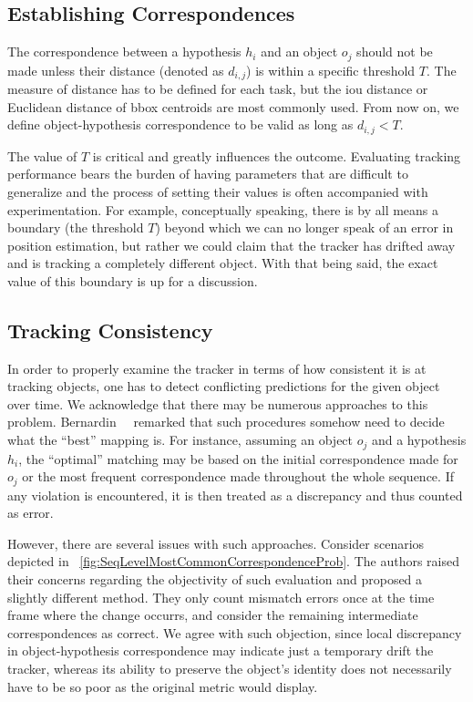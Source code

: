 \subsection{Establishing Correspondences}

The correspondence between a hypothesis $h_i$ and an object $o_j$ should not be made unless their distance (denoted as $d_{i,j}$) is within a specific threshold $T$. The measure of distance has to be defined for each task, but the \gls{iou} distance or Euclidean distance of \gls{bbox} centroids are most commonly used. From now on, we define object-hypothesis correspondence to be valid as long as $d_{i,j} < T$.

The value of $T$ is critical and greatly influences the outcome. Evaluating tracking performance bears the burden of having parameters that are difficult to generalize and the process of setting their values is often accompanied with experimentation. For example, conceptually speaking, there is by all means a boundary (the threshold $T$) beyond which we can no longer speak of an error in position estimation, but rather we could claim that the tracker has drifted away and is tracking a completely different object. With that being said, the exact value of this boundary is up for a discussion.

\subsection{Tracking Consistency}

In order to properly examine the tracker in terms of how consistent it is at tracking objects, one has to detect conflicting predictions for the given object over time. We acknowledge that there may be numerous approaches to this problem. Bernardin~\etal{}~\cite{bernardin2008clearmot} remarked that such procedures somehow need to decide what the ``best'' mapping is. For instance, assuming an object $o_j$ and a hypothesis $h_i$, the ``optimal'' matching may be based on the initial correspondence made for $o_j$ or the most frequent correspondence made throughout the whole sequence. If any violation is encountered, it is then treated as a discrepancy and thus counted as error.

However, there are several issues with such approaches. Consider scenarios depicted in \figstr{}~\ref{fig:SeqLevelMostCommonCorrespondenceProb}. The authors raised their concerns regarding the objectivity of such evaluation and proposed a slightly different method. They only count mismatch errors once at the time frame where the change occurrs, and consider the remaining intermediate correspondences as correct. We agree with such objection, since local discrepancy in object-hypothesis correspondence may indicate just a temporary drift the tracker, whereas its ability to preserve the object's identity does not necessarily have to be so poor as the original metric would display.

